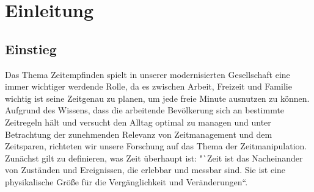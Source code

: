 \documentclass{Bericht}
\begin{document}






























\newpage


\section{Einleitung}
\subsection{Einstieg}

	Das Thema Zeitempfinden spielt in unserer modernisierten Gesellschaft eine immer wichtiger werdende Rolle, da es zwischen Arbeit, Freizeit und Familie wichtig ist seine Zeitgenau zu planen, um jede freie Minute ausnutzen zu können.	
	Aufgrund des Wissens, dass die arbeitende Bevölkerung sich an bestimmte Zeitregeln hält und versucht den Alltag optimal zu managen und unter Betrachtung der zunehmenden Relevanz von Zeitmanagement und dem Zeitsparen, richteten wir unsere Forschung auf das Thema der Zeitmanipulation. Zunächst gilt zu definieren, was Zeit überhaupt ist: "`Zeit ist das Nacheinander von Zuständen und Ereignissen, die erlebbar und messbar sind. Sie ist eine physikalische Größe für die Vergänglichkeit und Veränderungen“. 
\end{document}
